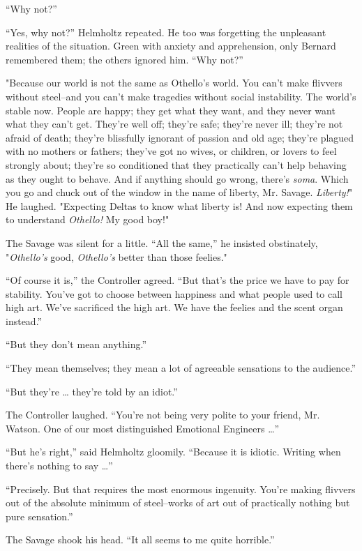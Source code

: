 \documentclass[12pt]{report}
\begin{document}
``Why not?''

``Yes, why not?'' Helmholtz repeated. He too was forgetting the
unpleasant realities of the situation. Green with anxiety and
apprehension, only Bernard remembered them; the others ignored him.
``Why not?''

"Because our world is not the same as Othello's world. You can't make
flivvers without steel--and you can't make tragedies without social
instability. The world's stable now. People are happy; they get what
they want, and they never want what they can't get. They're well off;
they're safe; they're never ill; they're not afraid of death; they're
blissfully ignorant of passion and old age; they're plagued with no
mothers or fathers; they've got no wives, or children, or lovers to feel
strongly about; they're so conditioned that they practically can't help
behaving as they ought to behave. And if anything should go wrong,
there's \emph{soma}. Which you go and chuck out of the window in the
name of liberty, Mr. Savage. \emph{Liberty!}" He laughed. "Expecting
Deltas to know what liberty is! And now expecting them to understand
\emph{Othello!} My good boy!"

The Savage was silent for a little. ``All the same,'' he insisted
obstinately, "\emph{Othello's} good, \emph{Othello's} better than those
feelies."

``Of course it is,'' the Controller agreed. ``But that's the price we
have to pay for stability. You've got to choose between happiness and
what people used to call high art. We've sacrificed the high art. We
have the feelies and the scent organ instead.''

``But they don't mean anything.''

``They mean themselves; they mean a lot of agreeable sensations to the
audience.''

``But they're \ldots{} they're told by an idiot.''

The Controller laughed. ``You're not being very polite to your friend,
Mr. Watson. One of our most distinguished Emotional Engineers \ldots{}''

``But he's right,'' said Helmholtz gloomily. ``Because it is idiotic.
Writing when there's nothing to say \ldots{}''

``Precisely. But that requires the most enormous ingenuity. You're
making flivvers out of the absolute minimum of steel--works of art out
of practically nothing but pure sensation.''

The Savage shook his head. ``It all seems to me quite horrible.''
\end{document}
